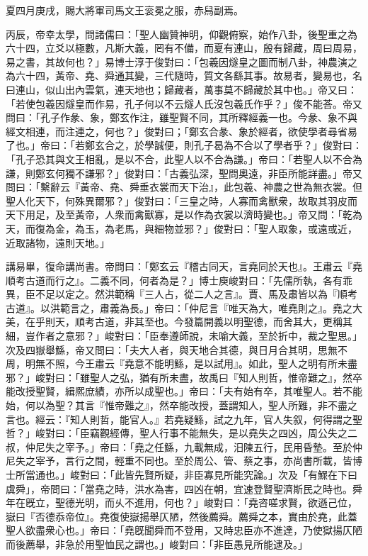 \begin{pinyinscope}
夏四月庚戌，賜大將軍司馬文王衮冕之服，赤舄副焉。

丙辰，帝幸太學，問諸儒曰：「聖人幽贊神明，仰觀俯察，始作八卦，後聖重之為六十四，立爻以極數，凡斯大義，罔有不備，而夏有連山，殷有歸藏，周曰周易，易之書，其故何也？」易博士淳于俊對曰：「包羲因燧皇之圖而制八卦，神農演之為六十四，黃帝、堯、舜通其變，三代隨時，質文各繇其事。故易者，變易也，名曰連山，似山出內雲氣，連天地也；歸藏者，萬事莫不歸藏於其中也。」帝又曰：「若使包羲因燧皇而作易，孔子何以不云燧人氏沒包羲氏作乎？」俊不能荅。帝又問曰：「孔子作彖、象，鄭玄作注，雖聖賢不同，其所釋經義一也。今彖、象不與經文相連，而注連之，何也？」俊對曰；「鄭玄合彖、象於經者，欲使學者尋省易了也。」帝曰：「若鄭玄合之，於學誠便，則孔子曷為不合以了學者乎？」俊對曰：「孔子恐其與文王相亂，是以不合，此聖人以不合為謙。」帝曰：「若聖人以不合為謙，則鄭玄何獨不謙邪？」俊對曰：「古義弘深，聖問奧遠，非臣所能詳盡。」帝又問曰：「繫辭云『黃帝、堯、舜垂衣裳而天下治』，此包羲、神農之世為無衣裳。但聖人化天下，何殊異爾邪？」俊對曰：「三皇之時，人寡而禽獸衆，故取其羽皮而天下用足，及至黃帝，人衆而禽獸寡，是以作為衣裳以濟時變也。」帝又問：「乾為天，而復為金，為玉，為老馬，與細物並邪？」俊對曰：「聖人取象，或遠或近，近取諸物，遠則天地。」

講易畢，復命講尚書。帝問曰：「鄭玄云『稽古同天，言堯同於天也』。王肅云『堯順考古道而行之』。二義不同，何者為是？」博士庾峻對曰：「先儒所執，各有乖異，臣不足以定之。然洪範稱『三人占，從二人之言』。賈、馬及肅皆以為『順考古道』。以洪範言之，肅義為長。」帝曰：「仲尼言『唯天為大，唯堯則之』。堯之大美，在乎則天，順考古道，非其至也。今發篇開義以明聖德，而舍其大，更稱其細，豈作者之意邪？」峻對曰：「臣奉遵師說，未喻大義，至於折中，裁之聖思。」次及四嶽舉鯀，帝又問曰：「夫大人者，與天地合其德，與日月合其明，思無不周，明無不照，今王肅云『堯意不能明鯀，是以試用』。如此，聖人之明有所未盡邪？」峻對曰：「雖聖人之弘，猶有所未盡，故禹曰『知人則哲，惟帝難之』，然卒能改授聖賢，緝熈庶績，亦所以成聖也。」帝曰：「夫有始有卒，其唯聖人。若不能始，何以為聖？其言『惟帝難之』，然卒能改授，蓋謂知人，聖人所難，非不盡之言也。經云：『知人則哲，能官人。』若堯疑鯀，試之九年，官人失叙，何得謂之聖哲？」峻對曰：「臣竊觀經傳，聖人行事不能無失，是以堯失之四凶，周公失之二叔，仲尼失之宰予。」帝曰：「堯之任鯀，九載無成，汨陳五行，民用昏墊。至於仲尼失之宰予，言行之間，輕重不同也。至於周公、管、蔡之事，亦尚書所載，皆博士所當通也。」峻對曰：「此皆先賢所疑，非臣寡見所能究論。」次及「有鰥在下曰虞舜」，帝問曰：「當堯之時，洪水為害，四凶在朝，宜速登賢聖濟斯民之時也。舜年在旣立，聖德光明，而乆不進用，何也？」峻對曰：「堯咨嗟求賢，欲遜己位，嶽曰『否德忝帝位』。堯復使嶽揚舉仄陋，然後薦舜。薦舜之本，實由於堯，此蓋聖人欲盡衆心也。」帝曰：「堯旣聞舜而不登用，又時忠臣亦不進達，乃使獄揚仄陋而後薦舉，非急於用聖恤民之謂也。」峻對曰：「非臣愚見所能逮及。」


\end{pinyinscope}
